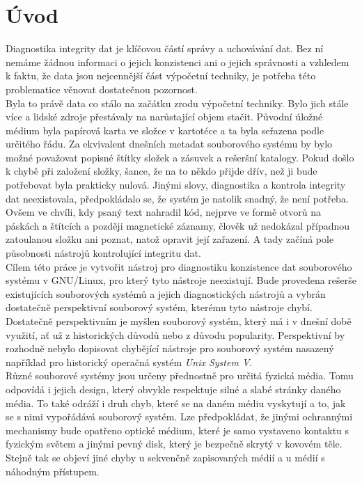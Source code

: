 \chapter*{Úvod}
{}

Diagnostika integrity dat je klíčovou částí správy a uchovávání dat. Bez ní nemáme žádnou informaci o jejich konzistenci ani o jejich správnosti a vzhledem k faktu, že data jsou nejcennější část výpočetní techniky, je potřeba této problematice věnovat dostatečnou pozornost.\\
Byla to právě data co stálo na začátku zrodu výpočetní techniky. Bylo jich stále více a lidské zdroje přestávaly na narůstající objem stačit. Původní úložné médium byla papírová karta ve složce v kartotéce a ta byla seřazena podle určitého řádu. Za ekvivalent dnešních metadat souborového systému by bylo možné považovat popisné štítky složek a zásuvek a rešeršní katalogy. Pokud došlo k chybě při založení složky, šance, že na to někdo přijde dřív, než ji bude potřebovat byla prakticky nulová. Jinými slovy, diagnostika a kontrola integrity dat neexistovala, předpokládalo se, že systém je natolik snadný, že není potřeba. Ovšem ve chvíli, kdy psaný text nahradil kód, nejprve ve formě otvorů na páskách a štítcích a později magnetické záznamy, člověk už nedokázal případnou zatoulanou složku ani poznat, natož opravit její zařazení. A tady začíná pole působnosti nástrojů kontrolující integritu dat.\\ 
Cílem této práce je vytvořit nástroj pro diagnostiku konzistence dat souborového systému v \mbox{GNU/Linux}, pro který tyto nástroje neexistují. Bude provedena rešerše existujících souborových systémů a jejich diagnostických nástrojů a vybrán dostatečně perspektivní souborový systém, kterému tyto nástroje chybí. Dostatečně perspektivním je myšlen souborový systém, který má i v dnešní době využití, ať už z historických důvodů nebo z důvodu popularity. Perspektivní by rozhodně nebylo dopisovat chybějící nástroje pro souborový systém nasazený například pro historický operačná systém \emph{Unix System V}.\\
Různé souborové systémy jsou určeny přednostně pro určitá fyzická média. Tomu odpovídá i jejich design, který obvykle respektuje silné a slabé stránky daného média. To také odráží i druh chyb, které se na daném médiu vyskytují a to, jak se s nimi vypořádává souborový systém. Lze předpokládat, že jinými ochrannými mechanismy bude opatřeno optické médium, které je samo vystaveno kontaktu s fyzickým světem a jinými pevný disk, který je bezpečně skrytý v kovovém těle. Stejně tak se objeví jiné chyby u sekvenčně zapisovaných médií a u médií s náhodným přístupem.\\
